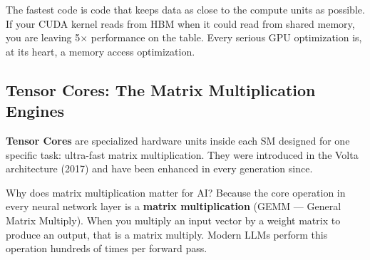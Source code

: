 \documentclass[10pt, oneside, openany]{book}
\newcommand{\tipbox}[2]{\begin{tcolorbox}[tipstyle, title={#1}]#2\end{tcolorbox}}
\newcommand{\keyterm}[1]{\textbf{\color{AccentOrange}#1}}
\begin{document}
\tipbox{The Golden Rule of GPU Programming}{
The fastest code is code that keeps data as close to the compute units as possible.
If your CUDA kernel reads from HBM when it could read from shared memory, you are
leaving 5$\times$ performance on the table.  Every serious GPU optimization is,
at its heart, a memory access optimization.
}

\subsection{Tensor Cores: The Matrix Multiplication Engines}

\keyterm{Tensor Cores} are specialized hardware units inside
each SM designed for one specific task: ultra-fast matrix multiplication.  They
were introduced in the Volta architecture (2017) and have been enhanced in every
generation since.

Why does matrix multiplication matter for AI?  Because the core operation in every
neural network layer is a \textbf{matrix multiplication} (GEMM --- General Matrix
Multiply).  When you multiply an input vector by a weight matrix to produce an
output, that is a matrix multiply.  Modern LLMs perform this operation hundreds of
times per forward pass.

\begin{center}
\end{center}
\end{document}

